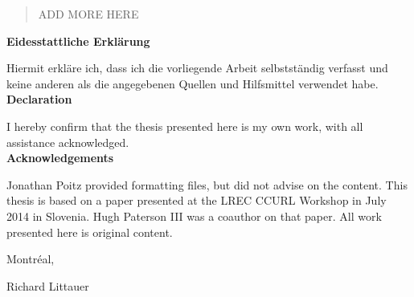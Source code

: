 \documentclass[12pt,a4paper]{article}
\begin{document}
	\thispagestyle{empty}
  \begin{abstract}
    \setlength{\parskip}{2ex plus 0.5ex minus 0.2ex}


    \noindent ADD MORE HERE

  \end{abstract}
  \newpage

\thispagestyle{empty}
\noindent\textbf{Eidesstattliche Erklärung}

\noindent Hiermit erkläre ich, dass ich die vorliegende Arbeit selbstständig verfasst und keine anderen als die angegebenen Quellen und Hilfsmittel verwendet habe.\\

\noindent\textbf{Declaration}

\noindent I hereby confirm that the thesis presented here is my own work, with all assistance acknowledged. \\

\noindent\textbf{Acknowledgements}

\noindent Jonathan Poitz provided formatting files, but did not advise on the content. This thesis is based on a paper presented at the LREC CCURL Workshop in July 2014 in Slovenia. Hugh Paterson III was a coauthor on that paper. All work presented here is original content.

\vspace{1cm}

\noindent Montr\'eal, \thedate

\vspace{1.7cm}

\noindent Richard Littauer


\newpage
%
\tableofcontents
\thispagestyle{empty}

\newpage


\setcounter{page}{1}
\end{document}
